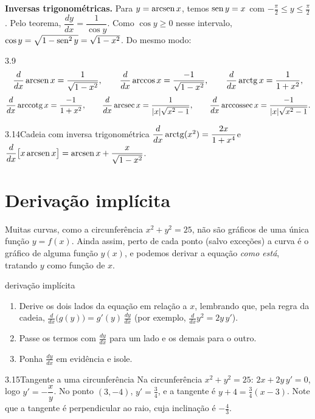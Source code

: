 \textbf{Inversas trigonométricas.} Para $y=\operatorname{arcsen} x$, temos $\operatorname{sen} y=x$ com
$-\frac\pi2\le y\le\frac\pi2$. Pelo teorema, $\dfrac{dy}{dx}=\dfrac1{\cos y}$. Como
$\cos y\ge0$ nesse intervalo, $\cos y=\sqrt{1-\operatorname{sen}^2y}=\sqrt{1-x^2}$. Do mesmo modo:

\begin{teorema}{3.9}
\[
\frac{d}{dx}\operatorname{arcsen} x=\frac{1}{\sqrt{1-x^2}},\qquad
\frac{d}{dx}\arccos x=\frac{-1}{\sqrt{1-x^2}},\qquad
\frac{d}{dx}\operatorname{arctg} x=\frac{1}{1+x^2},
\]
\[
\frac{d}{dx}\operatorname{arccotg} x=\frac{-1}{1+x^2},\qquad
\frac{d}{dx}\operatorname{arcsec} x=\frac{1}{|x|\sqrt{x^2-1}},\qquad
\frac{d}{dx}\operatorname{arccossec} x=\frac{-1}{|x|\sqrt{x^2-1}} .
\]
\end{teorema}

\begin{exemplo}{3.14}{Cadeia com inversa trigonométrica}
$\dfrac{d}{dx}\operatorname{arctg}(x^2)=\dfrac{2x}{1+x^4}$\qquad e\qquad
$\dfrac{d}{dx}\big[x\operatorname{arcsen} x\big]=\operatorname{arcsen} x+\dfrac{x}{\sqrt{1-x^2}}$.
\end{exemplo}

\section{Derivação implícita}

Muitas curvas, como a circunferência $x^2+y^2=25$, não são gráficos de uma única função
$y=f(x)$. Ainda assim, perto de cada ponto (salvo exceções) a curva é o gráfico de alguma
função $y(x)$, e podemos derivar a equação \emph{como está}, tratando $y$ como função de $x$.

\begin{estrategia}{derivação implícita}
\begin{enumerate}[label=\arabic*.]
\item Derive os dois lados da equação em relação a $x$, lembrando que, pela regra da
  cadeia, $\frac{d}{dx}\big(g(y)\big)=g'(y)\,\frac{dy}{dx}$ (por exemplo,
  $\frac{d}{dx}y^2=2y\,y'$).
\item Passe os termos com $\frac{dy}{dx}$ para um lado e os demais para o outro.
\item Ponha $\frac{dy}{dx}$ em evidência e isole.
\end{enumerate}
\end{estrategia}

\begin{exemplo}{3.15}{Tangente a uma circunferência}
Na circunferência $x^2+y^2=25$: $2x+2y\,y'=0$, logo $y'=-\dfrac xy$. No ponto $(3,-4)$,
$y'=\frac34$, e a tangente é $y+4=\tfrac34(x-3)$. Note que a tangente é perpendicular ao raio,
cuja inclinação é $-\tfrac43$.
\end{exemplo}

